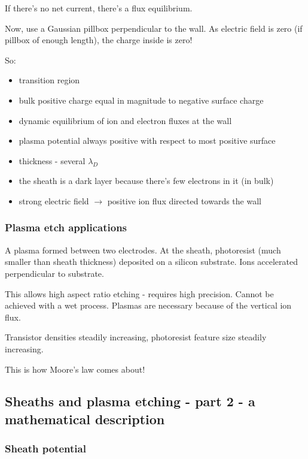 \documentclass[PlasmaNotes.tex]{subfiles}
\begin{document}
If there's no net current, there's a flux equilibrium.


Now, use a Gaussian pillbox perpendicular to the wall. As electric field is zero (if pillbox of enough length), the charge inside is zero!

So:
\begin{itemize}
\item transition region
\item bulk positive charge equal in magnitude to negative surface charge
\item dynamic equilibrium of ion and electron fluxes at the wall
\item plasma potential always positive with respect to most positive surface
\item thickness - several $\lambda_D$
\item the sheath is a dark layer because there's few electrons in it (in bulk)
\item strong electric field $\rightarrow$ positive ion flux directed towards the wall
\end{itemize}

\subsubsection{Plasma etch applications}

A plasma formed between two electrodes. At the sheath, photoresist (much smaller than sheath thickness) deposited on a silicon substrate. Ions accelerated perpendicular to substrate.

This allows high aspect ratio etching - requires high precision. Cannot be achieved with a wet process. Plasmas are necessary because of the vertical ion flux.

Transistor densities steadily increasing, photoresist feature size steadily increasing.

This is how Moore's law comes about!

\subsection{Sheaths and plasma etching - part 2 - a mathematical description}

\subsubsection{Sheath potential}

\newcommand{\dvpresheath}{\Delta V_{presheath}}
\end{document}

